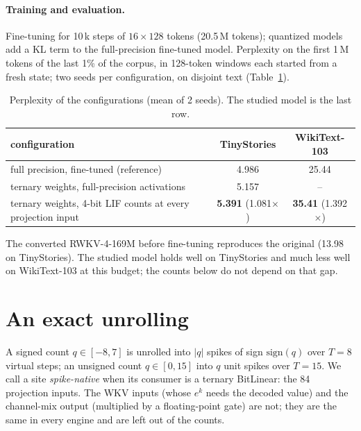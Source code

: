 \documentclass[11pt]{article}
\newcommand{\x}{$\times$}
\begin{document}
\paragraph{Training and evaluation.} Fine-tuning for 10\,k steps of $16 \times 128$ tokens
(20.5\,M tokens); quantized models add a KL term to the full-precision fine-tuned model.
Perplexity on the first 1\,M tokens of the last 1\% of the corpus, in 128-token windows each
started from a fresh state; two seeds per configuration, on disjoint text
(Table~\ref{tab:configs}).

\begin{table}[t]
\centering\small
\caption{Perplexity of the configurations (mean of 2 seeds). The studied model is the last row.}
\label{tab:configs}
\begin{tabular}{@{}lcc@{}}
\toprule
configuration & TinyStories & WikiText-103 \\
\midrule
full precision, fine-tuned (reference) & 4.986 & 25.44 \\
ternary weights, full-precision activations & 5.157 & -- \\
ternary weights, 4-bit LIF counts at every projection input & \textbf{5.391} (1.081\x)
  & \textbf{35.41} (1.392\x) \\
\bottomrule
\end{tabular}
\end{table}

The converted RWKV-4-169M before fine-tuning reproduces the original (13.98 on TinyStories). The
studied model holds well on TinyStories \citep{eldan2023tinystories} and much less well on
WikiText-103 \citep{merity2016wikitext} at this budget; the counts below do not depend on that
gap.

\section{An exact unrolling}
\label{sec:exact}

A signed count $q \in [-8, 7]$ is unrolled into $|q|$ spikes of sign $\mathrm{sign}(q)$ over
$T = 8$ virtual steps; an unsigned count $q \in [0, 15]$ into $q$ unit spikes over $T = 15$. We
call a site \emph{spike-native} when its consumer is a ternary BitLinear: the 84 projection
inputs. The WKV inputs (whose $e^k$ needs the decoded value) and the channel-mix output
(multiplied by a floating-point gate) are not; they are the same in every engine and are left
out of the counts.
\end{document}
